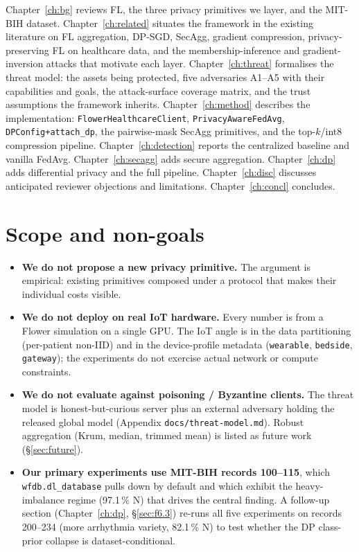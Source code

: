 \documentclass[11pt,a4paper]{report}
\begin{document}
Chapter~\ref{ch:bg} reviews FL, the three privacy primitives we layer, and the
MIT-BIH dataset.
Chapter~\ref{ch:related} situates the framework in the existing literature on
FL aggregation, DP-SGD, SecAgg, gradient compression, privacy-preserving FL
on healthcare data, and the membership-inference and gradient-inversion
attacks that motivate each layer.
Chapter~\ref{ch:threat} formalises the threat model: the assets being
protected, five adversaries A1--A5 with their capabilities and goals, the
attack-surface coverage matrix, and the trust assumptions the framework
inherits.
Chapter~\ref{ch:method} describes the implementation:
\texttt{FlowerHealthcareClient}, \texttt{PrivacyAwareFedAvg},
\texttt{DPConfig+attach\_dp}, the pairwise-mask SecAgg primitives, and the
top-$k$/int8 compression pipeline. Chapter~\ref{ch:detection} reports the
centralized baseline and vanilla FedAvg. Chapter~\ref{ch:secagg} adds secure
aggregation. Chapter~\ref{ch:dp} adds differential privacy and the full
pipeline. Chapter~\ref{ch:disc} discusses anticipated reviewer objections
and limitations. Chapter~\ref{ch:concl} concludes.

\section{Scope and non-goals}

\begin{itemize}[leftmargin=*]
  \item \textbf{We do not propose a new privacy primitive.} The argument is
  empirical: existing primitives composed under a protocol that makes their
  individual costs visible.
  \item \textbf{We do not deploy on real IoT hardware.} Every number is from a
  Flower simulation on a single GPU. The IoT angle is in the data partitioning
  (per-patient non-IID) and in the device-profile metadata (\texttt{wearable},
  \texttt{bedside}, \texttt{gateway}); the experiments do not exercise actual
  network or compute constraints.
  \item \textbf{We do not evaluate against poisoning / Byzantine clients.} The
  threat model is honest-but-curious server plus an external adversary holding
  the released global model (Appendix \texttt{docs/threat-model.md}). Robust
  aggregation (Krum, median, trimmed mean) is listed as future work
  (\S\ref{sec:future}).
  \item \textbf{Our primary experiments use MIT-BIH records 100--115},
  which \texttt{wfdb.dl\_database} pulls down by default and which exhibit
  the heavy-imbalance regime (97.1\,\% N) that drives the central finding.
  A follow-up section (Chapter~\ref{ch:dp}, \S\ref{sec:f6.3}) re-runs all
  five experiments on records 200--234 (more arrhythmia variety, 82.1\,\% N)
  to test whether the DP class-prior collapse is dataset-conditional.
\end{itemize}
\end{document}
